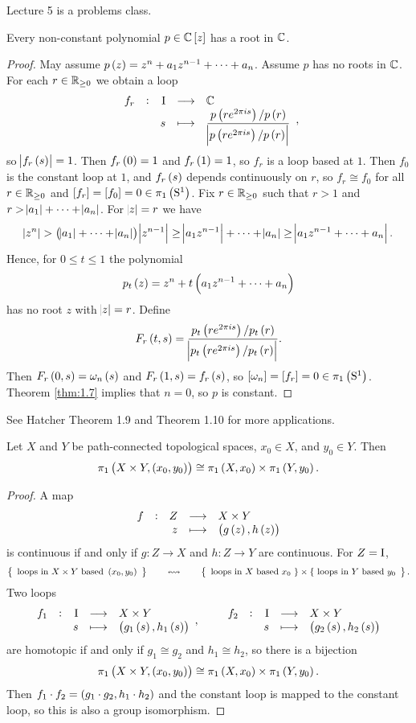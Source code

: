
Lecture 5 is a problems class.


\begin{theorem}
Every non-constant polynomial $ p \in \CC\sbr{z} $ has a root in $ \mathbb{C} $.
\end{theorem}

\begin{proof}
May assume $ p\br{z} = z^n + a_1z^{n - 1} + \dots + a_n $. Assume $ p $ has no roots in $ \mathbb{C} $. For each $ r \in \mathbb{R}_{\ge 0} $ we obtain a loop
$$ \function[f_r]{\I}{\CC}{s}{\dfrac{p\br{re^{2\pi is}} / p\br{r}}{\abs{p\br{re^{2\pi is}} / p\br{r}}}}, $$
so $ \abs{f_r\br{s}} = 1 $. Then $ f_r\br{0} = 1 $ and $ f_r\br{1} = 1 $, so $ f_r $ is a loop based at $ 1 $. Then $ f_0 $ is the constant loop at $ 1 $, and $ f_r\br{s} $ depends continuously on $ r $, so $ f_r \cong f_0 $ for all $ r \in \mathbb{R}_{\ge 0} $ and $ \sbr{f_r} = \sbr{f_0} = 0 \in \pi_1\br{\S^1} $. Fix $ r \in \mathbb{R}_{\ge 0} $ such that $ r > 1 $ and $ r > \abs{a_1} + \dots + \abs{a_n} $. For $ \abs{z} = r $ we have
$$ \abs{z^n} > \br{\abs{a_1} + \dots + \abs{a_n}}\abs{z^{n - 1}} \ge \abs{a_1z^{n - 1}} + \dots + \abs{a_n} \ge \abs{a_1z^{n - 1} + \dots + a_n}. $$
Hence, for $ 0 \le t \le 1 $ the polynomial
$$ p_t\br{z} = z^n + t\br{a_1z^{n - 1} + \dots + a_n} $$
has no root $ z $ with $ \abs{z} = r $. Define
$$ F_r\br{t, s} = \dfrac{p_t\br{re^{2\pi is}} / p_t\br{r}}{\abs{p_t\br{re^{2\pi is}} / p_t\br{r}}}. $$
Then $ F_r\br{0, s} = \omega_n\br{s} $ and $ F_r\br{1, s} = f_r\br{s} $, so $ \sbr{\omega_n} = \sbr{f_r} = 0 \in \pi_1\br{\S^1} $. Theorem \ref{thm:1.7} implies that $ n = 0 $, so $ p $ is constant.
\end{proof}

See Hatcher Theorem 1.9 and Theorem 1.10 for more applications.

\pagebreak

\begin{proposition}
Let $ X $ and $ Y $ be path-connected topological spaces, $ x_0 \in X $, and $ y_0 \in Y $. Then
$$ \pi_1\br{X \times Y, \br{x_0, y_0}} \cong \pi_1\br{X, x_0} \times \pi_1\br{Y, y_0}. $$
\end{proposition}

\begin{proof}
A map
$$ \function[f]{Z}{X \times Y}{z}{\br{g\br{z}, h\br{z}}} $$
is continuous if and only if $ g : Z \to X $ and $ h : Z \to Y $ are continuous. For $ Z = \mathrm{I} $,
$$ \correspondence{\text{loops in} \ X \times Y \ \text{based} \ \br{x_0, y_0}}{\text{loops in} \ X \ \text{based} \ x_0 \ \} \times \{ \ \text{loops in} \ Y \ \text{based} \ y_0}. $$
Two loops
$$ \function[f_1]{\I}{X \times Y}{s}{\br{g_1\br{s}, h_1\br{s}}}, \qquad \function[f_2]{\I}{X \times Y}{s}{\br{g_2\br{s}, h_2\br{s}}} $$
are homotopic if and only if $ g_1 \cong g_2 $ and $ h_1 \cong h_2 $, so there is a bijection
$$ \pi_1\br{X \times Y, \br{x_0, y_0}} \cong \pi_1\br{X, x_0} \times \pi_1\br{Y, y_0}. $$
Then $ f_1 \cdot f_2 = \br{g_1 \cdot g_2, h_1 \cdot h_2} $ and the constant loop is mapped to the constant loop, so this is also a group isomorphism.
\end{proof}

